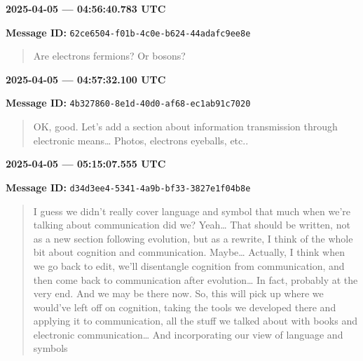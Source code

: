 \documentclass[11pt,letterpaper]{article}
\newcommand{\messageentry}[2]{%
  \Needspace{5\baselineskip}
  \medskip
  {\large\bfseries #1\par}
  {\small\textbf{Message ID:} \texttt{#2}\par}
}
\begin{document}
\messageentry{2025-04-05 --- 04:56:40.783 UTC}{62ce6504-f01b-4c0e-b624-44adafc9ee8e}
\begin{quote}\small
Are electrons fermions? Or bosons?
\end{quote}

\messageentry{2025-04-05 --- 04:57:32.100 UTC}{4b327860-8e1d-40d0-af68-ec1ab91c7020}
\begin{quote}\small
OK, good. Let’s add a section about information transmission through electronic means… Photos, electrons eyeballs, etc..
\end{quote}

\messageentry{2025-04-05 --- 05:15:07.555 UTC}{d34d3ee4-5341-4a9b-bf33-3827e1f04b8e}
\begin{quote}\small
I guess we didn’t really cover language and symbol that much when we’re talking about communication did we? Yeah… That should be written, not as a new section following evolution, but as a rewrite, I think of the whole bit about cognition and communication. Maybe… Actually, I think when we go back to edit, we’ll disentangle cognition from communication, and then come back to communication after evolution… In fact, probably at the very end. And we may be there now. So, this will pick up where we would’ve left off on cognition, taking the tools we developed there and applying it to communication, all the stuff we talked about with books and electronic communication… And incorporating our view of language and symbols
\end{quote}
\end{document}
